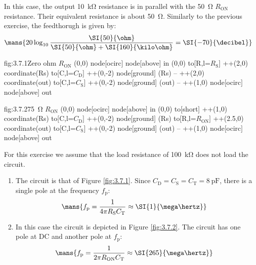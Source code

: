 In this case, the output \SI{10}{\kilo\ohm} resistance is in parallel with the \SI{50}{\ohm} $R_\text{ON}$ resistance. Their equivalent resistance is about \SI{50}{\ohm}. Similarly to the previous exercise, the feedthorugh is given by:
\[\mans{20\log_{10}\frac{\SI{50}{\ohm}}{\SI{50}{\ohm}+\SI{160}{\kilo\ohm}}=\SI{-70}{\decibel}}\]

\begin{circuit}{fig:3.7.1}{Zero ohm $R_\text{ON}$}
    (0,0) node[ocirc] {}
    node[above] {in}
    (0,0) to[R,l=$R_\text{S}$] ++(2,0) coordinate(Rs)
    to[C,l=$C_\text{D}$] ++(0,-2)
    node[ground] {}
    (Rs) -- ++(2,0) coordinate(out)
    to[C,l=$C_\text{S}$] ++(0,-2) 
    node[ground] {}
    (out) -- ++(1,0)
    node[ocirc] {}
    node[above] {out}
\end{circuit}

\begin{circuit}{fig:3.7.2}{\SI{75}{\ohm} $R_\text{ON}$}
    (0,0) node[ocirc] {}
    node[above] {in}
    (0,0) to[short] ++(1,0) coordinate(Rs)
    to[C,l=$C_\text{D}$] ++(0,-2)
    node[ground] {}
    (Rs) to[R,l=$R_\text{ON}$] ++(2.5,0) coordinate(out)
    to[C,l=$C_\text{S}$] ++(0,-2) 
    node[ground] {}
    (out) -- ++(1,0)
    node[ocirc] {}
    node[above] {out}
\end{circuit}

For this exercise we assume that the load resistance of \SI{100}{\kilo\ohm} does not load the circuit. 
\begin{enumerate}
    \item The circuit is that of Figure \ref{fig:3.7.1}. Since $C_\text{D}=C_\text{S}=C_\text{T}=\SI{8}{\pico\farad}$, there is a single pole at the frequency $f_\text{p}$:
    \[\mans{f_\text{p}=\frac{1}{4\pi R_\text{S}C_\text{T}}\approx\SI{1}{\mega\hertz}}\]
    \item In this case the circuit is depicted in Figure \ref{fig:3.7.2}. The circuit has one pole at DC and another pole at $f_\text{p}$:
    \[\mans{f_\text{p}=\frac{1}{2\pi R_\text{ON}C_\text{T}}\approx\SI{265}{\mega\hertz}}\]
\end{enumerate}

